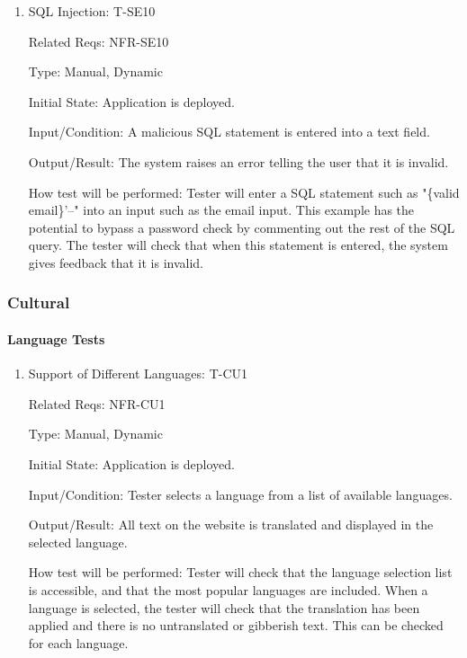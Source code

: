 \documentclass[12pt, titlepage]{article}
\begin{document}
\begin{enumerate}

\item{SQL Injection: T-SE10\\}

Related Reqs: NFR-SE10

Type: Manual, Dynamic
					
Initial State: Application is deployed.
					
Input/Condition: A malicious SQL statement is entered into a text field.
					
Output/Result: The system raises an error telling the user that it is invalid.
					
How test will be performed: Tester will enter a SQL statement such as "\{valid email\}'--" into an input such as the email input. This example has the potential to bypass a password check by commenting out the rest of the SQL query. The tester will check that when this statement is entered, the system gives feedback that it is invalid.

\end{enumerate}

\subsubsection{Cultural}
		
\paragraph{Language Tests}

\begin{enumerate}

\item{Support of Different Languages: T-CU1\\}

Related Reqs: NFR-CU1

Type: Manual, Dynamic
					
Initial State: Application is deployed.
					
Input/Condition: Tester selects a language from a list of available languages.
					
Output/Result: All text on the website is translated and displayed in the selected language.
					
How test will be performed: Tester will check that the language selection list is accessible, and that the most popular languages are included. When a language is selected, the tester will check that the translation has been applied and there is no untranslated or gibberish text. This can be checked for each language.
\end{enumerate}
\end{document}
